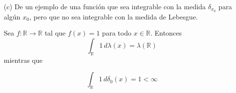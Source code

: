 \begin{itemize}
\begin{itemize}
\begin{proof}
Por definición de funciones simples,
\[
\int_{\mathbb{R}} f(x) \, d\delta_x = \int_{\mathbb{R}} \left( \sum_{i=1}^n a_i \chi_{A_i}(x) \right) d\delta_x = \sum_{i=1}^n a_i \delta_x(A_i)
\]
como \( A_i \cap A_j = \emptyset \) para \( j \neq i \), entonces para algún \( j \), \( \delta_x(A_j) = 1 \) y en el resto es \( 0 \), por lo  tanto,
\[
\int_{\mathbb{R}} f(x) \, d\delta_x = \sum_{i=1}^n a_i \chi_{A_i}(x)= a_j  = f(x).
\]

Por lo que la proposición es cierta para funciones simples positivas, ahora veamos que se cumple para funciones medibles no negativas. Tomemos \( f: \mathbb{R} \to [0, \infty] \) una función medible no negativa. Entonces, por un teorema visto en clase, existe \( \{f_n\}_{n=1}^{\infty} \) una sucesión de funciones simples tales que
\begin{align*}
0\leq f_n(x)\leq f_{n+1} \leq f(x) \text{ y }  \lim_{n \to \infty} f_n(x) = f(x)  
\end{align*}


para cada \( x \in \mathbb{R} \). Luego, por el teorema de la convergencia monótona,
\[
\int_{\mathbb{R}} f(x) \, d\delta_x = \lim_{n \to \infty} \int_{\mathbb{R}} f_n(x) \, d\delta_x = \lim_{n \to \infty} f_n(x_0) = f(x_0),
\]
por lo que esto se cumple para funciones medibles no negativas.

Por último, veamos el caso general. Para \( f: \mathbb{R} \to \mathbb{R} \) una función medible, recordamos que \( f = f^+ - f^- \), donde \( f^+ \), \( f^- \) son funciones medibles no negativas. Luego,
\[
\int_{\mathbb{R}} f(x) \, d\delta_x = \int_{\mathbb{R}} f^+(x) \, d\delta_x - \int_{\mathbb{R}} f^-(x) \, d\delta_x.
\]
Por lo probado anteriormente, como la parte negativa y la parte positiva son funciones medibles no negativas,
\[
\int_{\mathbb{R}} f(x) \, d\delta_x = f^+(x_0) - f^-(x_0) = f(x_0).
\]

\end{proof}

\item[(c)] De un ejemplo de una función que sea integrable con la medida $\delta_{x_0}$ para algún $x_0$, pero que no sea integrable con la medida de Lebesgue.\\
\begin{sol}
Sea $f: \mathbb{R} \to \mathbb{R}$ tal que $f(x) = 1$ para todo $x \in \mathbb{R}$. Entonces
$$
\displaystyle \int_{\mathbb{R}} 1 \, d\lambda(x) = \lambda(\mathbb{R})
$$
mientras que

\[ 
\int_{\mathbb{R}} 1 \, d\delta_0(x) = 1 < \infty 
\]


\end{sol}
\end{itemize}
\end{itemize}
